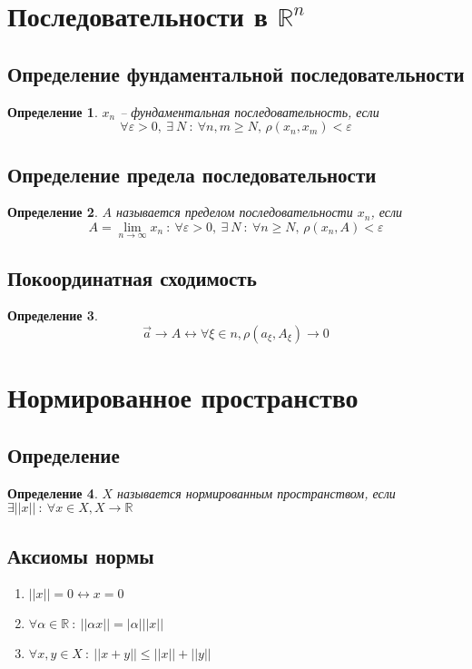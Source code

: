 \documentclass[a4paper, 12pt, titlepage]{article}
\newtheorem{Def}{Определение}[section]
\newcommand{\Real}{\mathbb{R}}
\begin{document}
	\section{Последовательности в $\mathbb{R}^n$}
		\subsection{Определение фундаментальной последовательности}
			\begin{Def}
				$x_n$ -- фундаментальная последовательность, если \[\forall \varepsilon > 0 ,\:\exists\: N \:\colon\: \forall n, m \ge N ,\, \rho (x_n, x_m) < \varepsilon\]
			\end{Def}
		\subsection{Определение предела последовательности}
			\begin{Def}
				$A$ называется пределом последовательности $x_n$, если
				\[A = \lim_{n \to \infty} x_n \:\colon\: \forall \varepsilon > 0 ,\:\exists\: N \:\colon\: \forall n \ge N ,\, \rho (x_n, A) < \varepsilon\]
			\end{Def}
		\subsection{Покоординатная сходимость}
			\begin{Def}
				\[\vec{a} \to A \leftrightarrow \forall \xi \in n, \rho (a_\xi, A_\xi) \to 0 \]
			\end{Def}
	\section{Нормированное пространство}	
		\subsection{Определение}
			\begin{Def}
				$X$ называется нормированным пространством, если $\exists ||x|| \:\colon\: \forall x \in X, X \to \Real$
			\end{Def}
		\subsection{Аксиомы нормы}
			\begin{enumerate}
				\item $||x|| = 0 \leftrightarrow x = 0$
				\item $\forall \alpha \in \Real \:\colon\: ||\alpha x|| = |\alpha| ||x||$
				\item $\forall x, y \in X \:\colon\: ||x + y|| \le ||x|| + ||y||$
			\end{enumerate}
\end{document}
